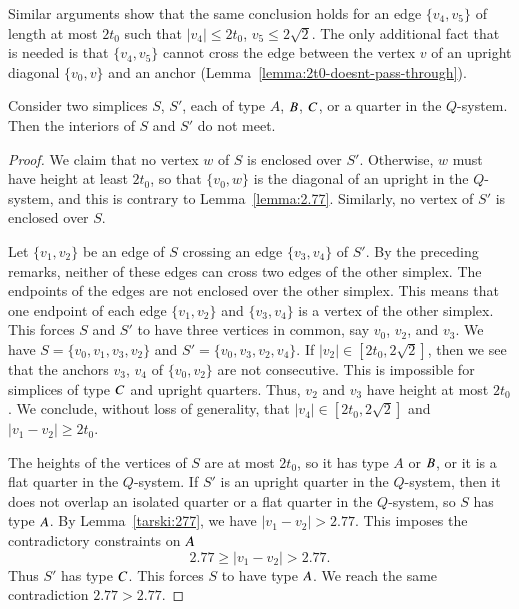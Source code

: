Similar arguments show that the same conclusion holds for an edge
$\{v_4,v_5\}$ of length at most $2t_0$ such that $|v_4|\le2t_0$,
$v_5\le2\sqrt{2}$.  The only additional fact that is needed is
that $\{v_4,v_5\}$ cannot cross the edge between the vertex $v$ of
an upright diagonal $\{v_0,v\}$ and an anchor
(Lemma~\ref{lemma:2t0-doesnt-pass-through}).





\begin{lemma}
    \label{lemma:no-overlap}
    Consider two simplices $S$, $S'$, each of  type $A$, $B$, $C$,
or a quarter in the $Q$-system.
    Then the interiors
    of
    $S$ and $S'$ do not meet.
\end{lemma}

\begin{proof}
We claim that no vertex $w$ of $S$ is enclosed over $S'$.
Otherwise, $w$ must have height at least $2t_0$, so that $\{v_0,w\}$
is the diagonal of an upright in the $Q$-system, and this is
contrary to Lemma~\ref{lemma:2.77}. Similarly, no vertex of $S'$
is enclosed over $S$.

Let $\{v_1,v_2\}$ be an edge of $S$ crossing an edge $\{v_3,v_4\}$ of
$S'$. By the preceding remarks, neither of these edges can cross
two edges of the other simplex. The endpoints of the edges are not
enclosed over the other simplex. This means that one endpoint of
each edge $\{v_1,v_2\}$ and $\{v_3,v_4\}$ is a vertex of the other
simplex.  This forces $S$ and $S'$ to have three vertices in
common, say $v_0$, $v_2$, and $v_3$.  We have $S=\{v_0,v_1,v_3,v_2\}$
and $S'=\{v_0,v_3,v_2,v_4\}$. If
    $|v_2|\in[2t_0,2\sqrt{2}]$,
then we see that the anchors $v_3$, $v_4$ of $\{v_0,v_2\}$ are not
consecutive.  This is impossible for simplices of type $C$ and
upright quarters.  Thus, $v_2$ and $v_3$ have height at most
$2t_0$.  We conclude, without loss of generality, that
    $|v_4|\in[2t_0,2\sqrt{2}]$
and $|v_1-v_2|\ge 2t_0$.

The heights of the vertices of $S$ are at most $2t_0$, so it has
type $A$ or $B$, or it is a flat quarter in the $Q$-system. If
$S'$ is an upright quarter in the $Q$-system, then it does not
overlap an isolated quarter or a flat quarter in the $Q$-system,
so $S$ has type $A$. By Lemma~\ref{tarski:277}, we have
$|v_1-v_2|>2.77$.  This imposes the contradictory constraints
on $A$
    $$
    2.77\ge |v_1-v_2|>2.77.
    $$
Thus $S'$ has type $C$.  This forces $S$ to have type $A$.  We
reach the same contradiction  $2.77 > 2.77$.
\end{proof}

